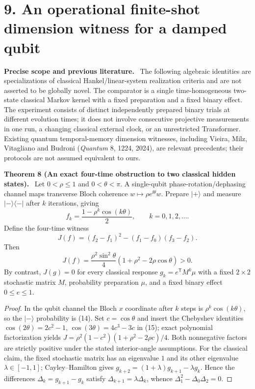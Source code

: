 \documentclass[11pt,a4paper,oneside]{book}
\newcommand{\statement}[3]{\par\medskip\noindent\textbf{#1 #2 (#3).}\ }
\newcommand{\note}[1]{\par\medskip\noindent\textbf{#1}\ }
\begin{document}
\section*{9. An operational finite-shot dimension witness for a damped qubit}
\note{Precise scope and previous literature.} The following algebraic identities are specializations of classical Hankel/linear-system realization criteria and are not asserted to be globally novel. The comparator is a single time-homogeneous two-state classical Markov kernel with a fixed preparation and a fixed binary effect. The experiment consists of distinct independently prepared binary trials at different evolution times; it does not involve consecutive projective measurements in one run, a changing classical external clock, or an unrestricted Transformer. Existing quantum temporal-memory dimension witnesses, including Vieira, Milz, Vitagliano and Budroni (\textit{Quantum} 8, 1224, 2024), are relevant precedents; their protocols are not assumed equivalent to ours.
\statement{Theorem}{8}{An exact four-time obstruction to two classical hidden states} Let $0<\rho\le1$ and $0<\theta<\pi$. A single-qubit phase-rotation/dephasing channel maps transverse Bloch coherence $w\mapsto\rho e^{\ii\theta}w$. Prepare $|+\rangle$ and measure $|-\rangle\langle-|$ after $k$ iterations, giving
\begin{equation}f_k=\frac{1-\rho^k\cos(k\theta)}2,\qquad k=0,1,2,\ldots.\tag{14}\end{equation}
Define the four-time witness
\begin{equation}J(f)=(f_2-f_1)^2-(f_1-f_0)(f_3-f_2).\tag{15}\end{equation}
Then
\begin{equation}J(f)=\frac{\rho^2\sin^2\theta}{4}(1+\rho^2-2\rho\cos\theta)>0.\tag{16}\end{equation}
By contrast, $J(g)=0$ for every classical response $g_k=e^{\mathsf T}M^k\mu$ with a fixed $2\times2$ stochastic matrix $M$, probability preparation $\mu$, and a fixed binary effect $0\le e\le1$.
\begin{proof}In the qubit channel the Bloch $x$ coordinate after $k$ steps is $\rho^k\cos(k\theta)$, so the $|-\rangle$ probability is (14). Set $c=\cos\theta$ and insert the Chebyshev identities $\cos(2\theta)=2c^2-1$, $\cos(3\theta)=4c^3-3c$ in (15); exact polynomial factorization yields $J=\rho^2(1-c^2)(1+\rho^2-2\rho c)/4$. Both nonnegative factors are strictly positive under the stated interior-angle assumptions. For the classical claim, the fixed stochastic matrix has an eigenvalue $1$ and its other eigenvalue $\lambda\in[-1,1]$; Cayley--Hamilton gives $g_{k+2}=(1+\lambda)g_{k+1}-\lambda g_k$. Hence the differences $\Delta_k=g_{k+1}-g_k$ satisfy $\Delta_{k+1}=\lambda\Delta_k$, whence $\Delta_1^2-\Delta_0\Delta_2=0$.\end{proof}
\end{document}
